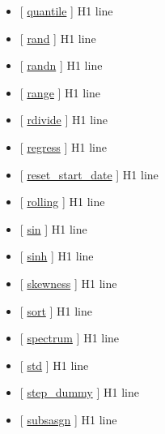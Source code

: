\documentclass[letterpaper,10pt,english]{sphinxmanual}
\begin{document}
\begin{itemize}
\item {} 
{[} {\hyperref[classes/time_series/@ts/ts:quantile]{quantile}} {]}   H1 line

\item {} 
{[} {\hyperref[classes/time_series/@ts/ts:rand]{rand}} {]}   H1 line

\item {} 
{[} {\hyperref[classes/time_series/@ts/ts:randn]{randn}} {]}   H1 line

\item {} 
{[} {\hyperref[classes/time_series/@ts/ts:range]{range}} {]}   H1 line

\item {} 
{[} {\hyperref[classes/time_series/@ts/ts:rdivide]{rdivide}} {]}   H1 line

\item {} 
{[} {\hyperref[classes/time_series/@ts/ts:regress]{regress}} {]}   H1 line

\item {} 
{[} {\hyperref[classes/time_series/@ts/ts:reset-start-date]{reset\_start\_date}} {]}   H1 line

\item {} 
{[} {\hyperref[classes/time_series/@ts/ts:rolling]{rolling}} {]}   H1 line

\item {} 
{[} {\hyperref[classes/time_series/@ts/ts:sin]{sin}} {]}   H1 line

\item {} 
{[} {\hyperref[classes/time_series/@ts/ts:sinh]{sinh}} {]}   H1 line

\item {} 
{[} {\hyperref[classes/time_series/@ts/ts:skewness]{skewness}} {]}   H1 line

\item {} 
{[} {\hyperref[classes/time_series/@ts/ts:sort]{sort}} {]}   H1 line

\item {} 
{[} {\hyperref[classes/time_series/@ts/ts:spectrum]{spectrum}} {]}   H1 line

\item {} 
{[} {\hyperref[classes/time_series/@ts/ts:std]{std}} {]}   H1 line

\item {} 
{[} {\hyperref[classes/time_series/@ts/ts:step-dummy]{step\_dummy}} {]}   H1 line

\item {} 
{[} {\hyperref[classes/time_series/@ts/ts:subsasgn]{subsasgn}} {]}   H1 line


\end{itemize}
\end{document}
